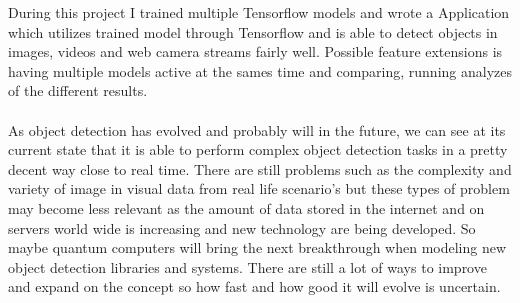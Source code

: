 
During this project I trained multiple Tensorflow models and wrote a Application which utilizes trained model through Tensorflow and is
able to detect objects in images, videos and web camera streams fairly well. Possible feature extensions is having multiple models active at the
sames time and comparing, running analyzes of the different results.\\\\
As object detection has evolved and probably will in the future, we can see at its current state that it is able to perform complex object
detection tasks in a pretty decent way close to real time. There are still problems such as the complexity and variety of image in visual
data from real life scenario's but these types of problem may become less relevant as the amount of data stored in the internet and on
servers world wide is increasing and new technology are being developed. So maybe  quantum computers will bring the next breakthrough when
modeling new object detection libraries and systems. There are still a lot of ways to improve and expand on the concept so how fast and how
good it will evolve is uncertain.


